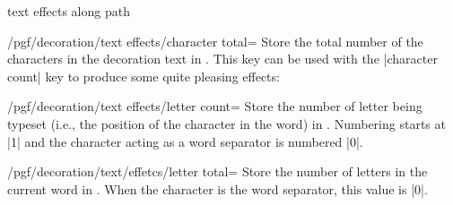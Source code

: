 \begin{decoration}{text effects along path}
    \begin{key}{/pgf/decoration/text effects/character total=}
        Store the total number of the characters in the decoration text in
        . This key can be used with the |character count| key to
        produce some quite pleasing effects:
\begin{codeexample}[preamble={\usetikzlibrary{decorations.text,math}}]
\end{codeexample}
    \end{key}

    \begin{key}{/pgf/decoration/text effects/letter count=}
        Store the number of letter being typeset (i.e., the position of the
        character in the word) in . Numbering starts at |1| and the
        character acting as a word separator is numbered |0|.
\begin{codeexample}[preamble={\usetikzlibrary{decorations.text}}]
\end{codeexample}
    \end{key}

    \begin{key}{/pgf/decoration/text/effetcs/letter total=}
        Store the number of letters in the current word in . When
        the character is the word separator, this value is |0|.
    \end{key}


\end{decoration}
